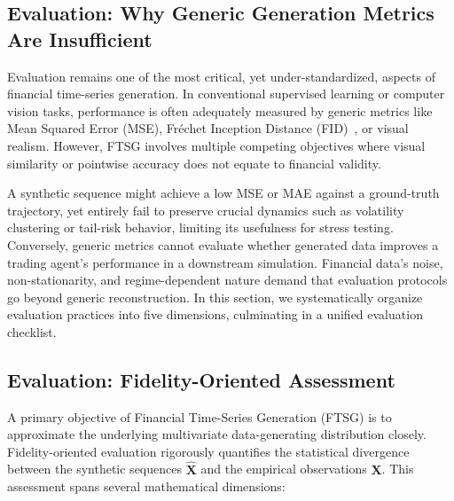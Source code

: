 \subsection{Evaluation: Why Generic Generation Metrics Are Insufficient}
\label{sec:evaluation}

Evaluation remains one of the most critical, yet under-standardized, aspects of financial time-series generation. In conventional supervised learning or computer vision tasks, performance is often adequately measured by generic metrics like Mean Squared Error (MSE), Fréchet Inception Distance (FID)~\citep{heusel2017gans}, or visual realism. However, FTSG involves multiple competing objectives where visual similarity or pointwise accuracy does not equate to financial validity.

A synthetic sequence might achieve a low MSE or MAE against a ground-truth trajectory, yet entirely fail to preserve crucial dynamics such as volatility clustering or tail-risk behavior, limiting its usefulness for stress testing. Conversely, generic metrics cannot evaluate whether generated data improves a trading agent's performance in a downstream simulation. Financial data's noise, non-stationarity, and regime-dependent nature demand that evaluation protocols go beyond generic reconstruction. In this section, we systematically organize evaluation practices into five dimensions, culminating in a unified evaluation checklist.

\subsection{Evaluation: Fidelity-Oriented Assessment}
A primary objective of Financial Time-Series Generation (FTSG) is to approximate the underlying multivariate data-generating distribution closely. Fidelity-oriented evaluation rigorously quantifies the statistical divergence between the synthetic sequences $\hat{\mathbf{X}}$ and the empirical observations $\mathbf{X}$. This assessment spans several mathematical dimensions:

